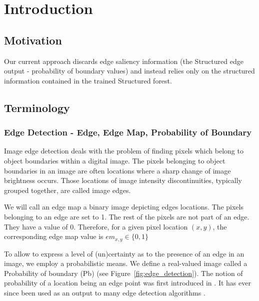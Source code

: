 \chapter{Introduction}
\label{Chapter1}
\section{Motivation}

Our current approach discards edge saliency information (the Structured edge~\cite{DollarICCV13edges} output - probability of boundary values) and instead relies only on the structured information contained in the trained Structured forest.

\section{Terminology}
\subsection{Edge Detection - Edge, Edge Map, Probability of Boundary}

Image edge detection deals with the problem of finding pixels which belong to object boundaries within a digital image. The pixels belonging to object boundaries in an image are often locations where a sharp change of image brightness occurs. Those locations of image intensity discontinuities, typically grouped together, are called image edges.

We will call an edge map a binary image depicting edges locations. The pixels belonging to an edge are set to 1. The rest of the pixels are not part of an edge. They have a value of 0. Therefore, for a given pixel location $(x,y)$, the corresponding edge map value is $em_{x,y} \in \{0,1\}$

To allow to express a level of (un)certainty as to the presence of an edge in an image, we employ a probabilistic means. We define a real-valued image called a Probability of boundary (Pb) (see Figure~\ref{fig:edge_detection}). The notion of probability of a location being an edge point was first introduced in \cite{martin2004learning}. It has ever since been used as an output to many edge detection algorithms \cite{Maire2008using}.

